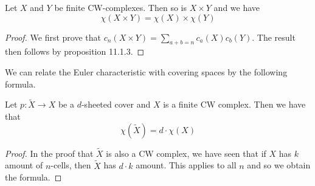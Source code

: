 \documentclass[a4paper]{article}
\begin{document}
\begin{prp}{}{} Let $X$ and $Y$ be finite CW-complexes. Then so is $X\times Y$ and we have $$\chi(X\times Y)=\chi(X)\times\chi(Y)$$ \tcbline
\begin{proof}
We first prove that $c_n(X\times Y)=\sum_{a+b=n}c_a(X)c_b(Y)$. The result then follows by proposition 11.1.3. 
\end{proof}
\end{prp}

We can relate the Euler characteristic with covering spaces by the following formula. 

\begin{prp}{}{} Let $p:\tilde{X}\to X$ be a $d$-sheeted cover and $X$ is a finite CW complex. Then we have that $$\chi(\tilde{X})=d\cdot\chi(X)$$ \tcbline
\begin{proof}
In the proof that $\tilde{X}$ is also a CW complex, we have seen that if $X$ has $k$ amount of $n$-cells, then $\tilde{X}$ has $d\cdot k$ amount. This applies to all $n$ and so we obtain the formula. 
\end{proof}
\end{prp}
\end{document}
